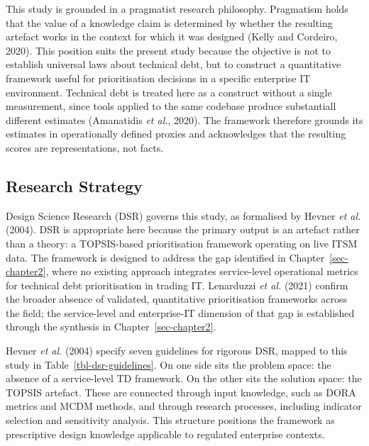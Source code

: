 \documentclass[
  12pt,
  letterpaper,
  12pt,
  oneside,
  english,
  onehalfspacing,
  headsepline]{MastersDoctoralThesis}
\begin{document}
This study is grounded in a pragmatist research philosophy. Pragmatism
holds that the value of a knowledge claim is determined by whether the
resulting artefact works in the context for which it was designed (Kelly
and Cordeiro, 2020). This position suits the present study because the
objective is not to establish universal laws about technical debt, but
to construct a quantitative framework useful for prioritisation
decisions in a specific enterprise IT environment. Technical debt is
treated here as a construct without a single measurement, since tools
applied to the same codebase produce substantiall different estimates
(Amanatidis \emph{et al.}, 2020). The framework therefore grounds its
estimates in operationally defined proxies and acknowledges that the
resulting scores are representations, not facts.

\subsection{Research Strategy}\label{research-strategy}

Design Science Research (DSR) governs this study, as formalised by
Hevner \emph{et al.} (2004). DSR is appropriate here because the primary
output is an artefact rather than a theory: a TOPSIS-based
prioritisation framework operating on live ITSM data. The framework is
designed to address the gap identified in Chapter~\ref{sec-chapter2},
where no existing approach integrates service-level operational metrics
for technical debt prioritisation in trading IT. Lenarduzzi \emph{et
al.} (2021) confirm the broader absence of validated, quantitative
prioritisation frameworks across the field; the service-level and
enterprise-IT dimension of that gap is established through the synthesis
in Chapter~\ref{sec-chapter2}.

Hevner \emph{et al.} (2004) specify seven guidelines for rigorous DSR,
mapped to this study in Table~\ref{tbl-dsr-guidelines}. On one side sits
the problem space: the absence of a service-level TD framework. On the
other sits the solution space: the TOPSIS artefact. These are connected
through input knowledge, such as DORA metrics and MCDM methods, and
through research processes, including indicator selection and
sensitivity analysis. This structure positions the framework as
prescriptive design knowledge applicable to regulated enterprise
contexts.
\end{document}
